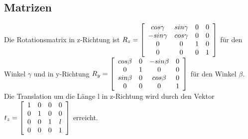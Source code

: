 \documentclass[a4paper,12pt]{article}
\begin{document}
\subsection{Matrizen}
Die Rotationsmatrix in z-Richtung ist $R_{z} = \left[\begin{array}{ c c c c }
cos \gamma & sin \gamma & 0 & 0 \\
-sin \gamma & cos \gamma & 0 & 0 \\
0 & 0 & 1 & 0 \\
0 & 0 & 0 & 1
\end{array} \right]$ für den Winkel $\gamma$ und in y-Richtung
$R_{y} = \left[\begin{array}{ c c c c }
cos \beta & 0 & -sin \beta & 0 \\
0 & 1 & 0 & 0 \\
sin \beta & 0 & cos \beta & 0 \\
0 & 0 & 0 & 1
\end{array} \right]$ für den Winkel $\beta$. Die Translation um die Länge l in
z-Richtung wird durch den Vektor $t_{z} = \left[\begin{array}{ c c c c }
1 & 0 & 0 & 0 \\
0 & 1 & 0 & 0 \\
0 & 0 & 1 & l \\
0 & 0 & 0 & 1
\end{array}\right]$ erreicht.
\end{document}
